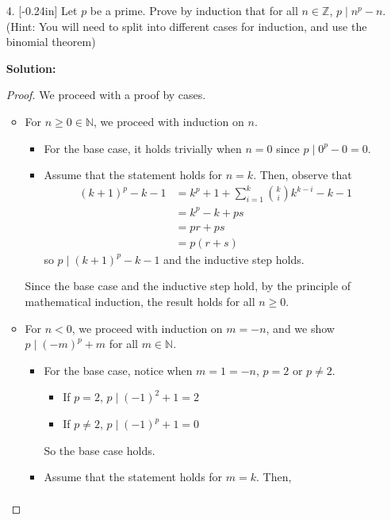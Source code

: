 \documentclass[letterpaper,12pt]{article}
\theoremstyle{definition}
\begin{document}
\begin{enumerate}
    \item[4.] \reversemarginpar{}[-0.24in] Let $p$ be a prime. Prove by induction that for all $n \in \mathbb{Z}$, $p \mid n^p - n$. (Hint: You will need to split into different cases for induction, and use the binomial theorem)
    \begin{mdframed}
         \textbf{Solution:}
         \begin{proof}
             We proceed with a proof by cases.
             \begin{itemize}
                 \item For $n \geq 0 \in \mathbb{N}$, we proceed with induction on $n$. \begin{itemize}
                     \item For the base case, it holds trivially when $n=0$ since $p \mid 0^p - 0 = 0$.
                     \item Assume that the statement holds for $n=k$. Then, observe that \begin{align*}
                         (k+1)^{p} - k - 1 &= k^p + 1 + \sum_{i=1}^{k}{k \choose i} k^{k-i} -k-1\\
                     &= k^p - k + ps \\
                     &= pr + ps \\
                     &= p(r+s)
                     \end{align*}
                     so $p \mid (k+1)^p - k-1$ and the inductive step holds.
                 \end{itemize}
                 Since the base case and the inductive step hold, by the principle of mathematical induction, the result holds for all $n \geq 0$.
                 \item For $n < 0$, we proceed with induction on $m=-n$, and we show $p \mid (-m)^p+m$ for all $m \in \mathbb{N}$. \begin{itemize}
                     \item For the base case, notice when $m=1 = -n$, $p = 2$ or $p \neq 2$. \begin{itemize}
                         \item If $p = 2$, $p \mid (-1)^2 + 1 = 2$ 
                         \item If $p \neq 2$, $p \mid (-1)^p + 1 = 0$
                     \end{itemize}
                     So the base case holds.
                     \item  Assume that the statement holds for $m=k$. Then, \begin{align*}

\end{align*}
\end{itemize}
\end{itemize}
\end{proof}
\end{mdframed}
\end{enumerate}
\end{document}
